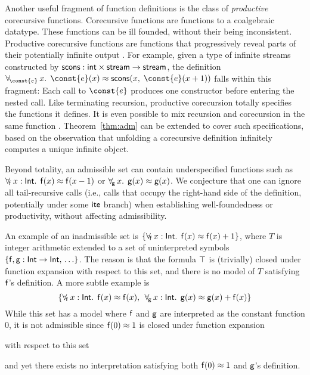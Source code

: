Another useful fragment of function definitions is the class of
\emph{productive} corecursive functions. Corecursive functions are functions to
a coalgebraic datatype. These functions can be ill founded, without
their being inconsistent. Productive corecursive functions are functions that
progressively reveal parts of their potentially infinite
output \cite{turner-1995,mcbride-productive}.
For example, given a type of infinite streams constructed by
$\mathsf{scons} : \mathsf{int} \times \mathsf{stream} \to \mathsf{stream}$,
the definition
$\forallf{\const{e}} x.\;\, \const{e}(x) \teq \con{scons}(x,\; \const{e}(x + 1))$
falls within this fragment: Each call to $\const{e}$ produces one
constructor before entering the nested call. Like terminating recursion,
productive corecursion totally specifies the functions it defines.
It is even possible to mix recursion and corecursion in the same function
\cite{blanchette-et-al-2015-fouco}. Theorem~\ref{thm:adm} can be extended to
cover such specifications, based on the observation that unfolding
a corecursive definition infinitely computes a unique infinite object.

\begin{rep}
Beyond totality, an admissible set can contain underspecified functions
such as $\forall_{\!\mathsf{f}\:} x : \mathsf{Int}.\allowbreak\;\, \mathsf{f}( x )
\approx \mathsf{f}( x - 1 )$ or $\forall_{\!\mathsf{g}\:} x.\allowbreak\;\, \mathsf{g}( x
) \approx \mathsf{g}( x )$. We conjecture that one can ignore all
tail-recursive calls (i.e., calls that occupy the right-hand side of the
definition, potentially under some $\mathsf{ite}$ branch) when establishing well-foundedness
or productivity, without affecting admissibility.
\end{rep}

\newcommand\badassex{
 \{\forallf{\con{f}} x : \typeint.\;\, \con{f}( x ) \teq \con{f}( x ),\allowbreak\;\,
 \forallf{\con{g}} x : \typeint.\;\, \con{g}( x ) \teq \con{g}( x ) + \nobreak\con{f}( x )\}}

An example of an inadmissible set is
$\{ \forall_{\!\mathsf{f}\:} x : \mathsf{Int}.\;\, \mathsf{f}( x ) \approx \mathsf{f}( x ) + 1 \}$,
where $T$ is integer arithmetic extended to a set of uninterpreted symbols
$\{\mathsf{f}, \mathsf{g} :\mathsf{Int} \rightarrow \mathsf{Int},\, \ldots \}$.
The reason is that the formula $\top$ is (trivially) closed under function expansion with respect to this set,
and there is no model of $T$
satisfying $\mathsf{f}$'s definition. A more subtle example is
\[\badassex\]
While this set has a model where $\mathsf{f}$ and $\mathsf{g}$ are interpreted as the
constant function $0$, it is not admissible since %
$\mathsf{f}( 0 ) \approx 1$ is
closed under function expansion \begin{rep}with respect to this set\end{rep}
and yet there exists
no interpretation satisfying both $\mathsf{f}( 0 ) \approx 1$ and $\mathsf{g}$'s
definition.

